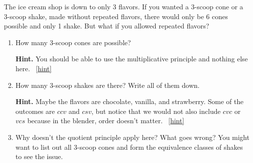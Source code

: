 \documentclass{book}
\begin{document}
\setcounter{project}{119}
\addtocounter{project}{-1}
\begin{activity}[]\label{activity-112}
\hypertarget{p-841}{}%
The ice cream shop is down to only 3 flavors.  If you wanted a 3-scoop cone or a 3-scoop shake, made without repeated flavors, there would only be 6 cones possible and only 1 shake.  But what if you allowed repeated flavors?%
\begin{enumerate}[font=\bfseries,label=(\alph*),ref=\alph*]
\item\label{task-153} \hypertarget{p-842}{}%
How many 3-scoop cones are possible?%
\par\smallskip%
\noindent\textbf{Hint.}\hypertarget{hint-78}{}\quad%
\hypertarget{p-843}{}%
You should be able to use the multiplicative principle and nothing else here.%
~\hfill{\tiny\hyperlink{a-119.a}{[hint]}\hypertarget{q-119.a}{}}\item\label{task-154} \hypertarget{p-844}{}%
How many 3-scoop shakes are there?  Write all of them down.%
\par\smallskip%
\noindent\textbf{Hint.}\hypertarget{hint-79}{}\quad%
\hypertarget{p-845}{}%
Maybe the flavors are chocolate, vanilla, and strawberry.  Some of the outcomes are \(ccv\) and \(csv\), but notice that we would not also include \(cvc\) or \(vcs\) because in the blender, order doesn't matter.%
~\hfill{\tiny\hyperlink{a-119.b}{[hint]}\hypertarget{q-119.b}{}}\item\label{task-155} \hypertarget{p-846}{}%
Why doesn't the quotient principle apply here?  What goes wrong?  You might want to list out all 3-scoop cones and form the equivalence classes of shakes to see the issue.%
\end{enumerate}
\end{activity}
\end{document}
